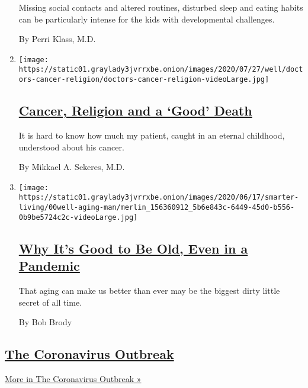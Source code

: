 \begin{enumerate}
  Missing social contacts and altered routines, disturbed sleep and
  eating habits can be particularly intense for the kids with
  developmental challenges.

  By Perri Klass, M.D.
\item
  \texttt{[image: https://static01.graylady3jvrrxbe.onion/images/2020/07/27/well/doctors-cancer-religion/doctors-cancer-religion-videoLarge.jpg]}

  \hypertarget{cancer-religion-and-a-good-death}{%
  \subsection{\texorpdfstring{\href{/2020/07/28/well/live/cancer-religion-and-a-good-death.html}{Cancer,
  Religion and a `Good'
  Death}}{Cancer, Religion and a `Good' Death}}\label{cancer-religion-and-a-good-death}}

  It is hard to know how much my patient, caught in an eternal
  childhood, understood about his cancer.

  By Mikkael A. Sekeres, M.D.
\item
  \texttt{[image: https://static01.graylady3jvrrxbe.onion/images/2020/06/17/smarter-living/00well-aging-man/merlin\_156360912\_5b6e843c-6449-45d0-b556-0b9be5724c2c-videoLarge.jpg]}

  \hypertarget{why-its-good-to-be-old-even-in-a-pandemic}{%
  \subsection{\texorpdfstring{\href{/2020/07/28/well/live/aging-benefits-pandemic.html}{Why
  It's Good to Be Old, Even in a
  Pandemic}}{Why It's Good to Be Old, Even in a Pandemic}}\label{why-its-good-to-be-old-even-in-a-pandemic}}

  That aging can make us better than ever may be the biggest dirty
  little secret of all time.

  By Bob Brody
\end{enumerate}

\hypertarget{the-coronavirus-outbreak}{%
\subsection{\texorpdfstring{\href{/news-event/coronavirus}{The
Coronavirus
Outbreak}}{The Coronavirus Outbreak}}\label{the-coronavirus-outbreak}}

\href{/news-event/coronavirus}{More in The Coronavirus Outbreak »}

